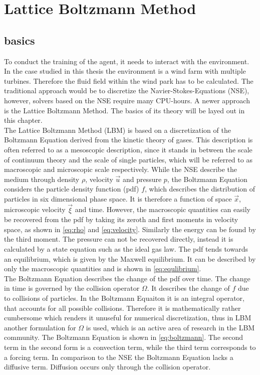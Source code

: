 \section{Lattice Boltzmann Method}
\subsection{basics}
To conduct the training of the agent, it needs to interact with the environment. In the case studied in this thesis the environment is a wind farm with multiple turbines. Therefore the fluid field within the wind park has to be calculated. The traditional approach would be to discretize the Navier-Stokes-Equations (NSE), however, solvers based on the NSE require many CPU-hours. A newer approach is the Lattice Boltzmann Method. The basics of its theory will be layed out in this chapter. \\ 
The Lattice Boltzmann Method (LBM) is based on a discretization of the Boltzmann Equation derived from the kinetic theory of gases. This description is often referred to as a mesoscopic description, since it stands in  between the scale of continuum theory and the scale of single particles, which will be referred to as macroscopic and microscopic scale respectively. While the NSE describe the medium through density $\rho$, velocity $\vec{u}$ and pressure $p$, the Boltzmann Equation considers the particle density function (pdf) $f$, which describes the distribution of particles in six dimensional phase space. It is therefore a function of space $\vec{x}$, microscopic velocity $\vec{\xi}$ and time. However, the macroscopic quantities can easily be recovered from the pdf by taking its zeroth and first moments in velocity space, as shown in \eqref{eq:rho} and \eqref{eq:velocity}. Similarly the energy can be found by the third moment. The pressure can not be recovered directly, instead it is calculated by a state equation such as the ideal gas law. The pdf tends towards an equilibrium, which is given by the Maxwell equilibrium. It can be described by only the macroscopic quantities and is shown in \eqref{eq:equlibrium}. \cite[p. 15- 21]{kruger_lattice_2017} \\
The Boltzmann Equation describes the change of the pdf over time. The change in time is governed by the collision operator $\Omega$. It describes the change of $f$ due to collisions of particles. In the Boltzmann Equaiton it is an integral operator, that accounts for all possible collisions. Therefore it is mathematically rather cumbersome which renders it unuseful for numerical discretization, thus in LBM another formulation for $\Omega$ is used, which is an active area of research in the LBM community\cite{coreixas_comprehensive_2019}. The Boltzmann Equation is shown in \eqref{eq:boltzmann}. The second term in the second form is a convection term, while the third term corresponds to a forcing term. In comparison to the NSE the Boltzmann Equation lacks a diffusive term. Diffusion occurs only through the collision operator. \cite[p. ]{kruger_lattice_2017}
